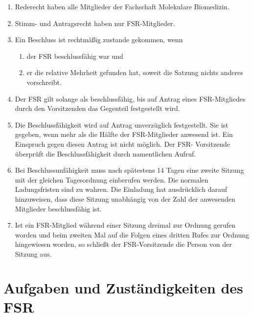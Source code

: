 \documentclass{article}
\providecommand{\tightlist}{\setlength{\itemsep}{0pt}\setlength{\parskip}{0pt}}
\begin{document}
\begin{enumerate}[(1)]
	\item Rederecht haben alle Mitglieder der Fachschaft Molekulare Biomedizin.
	\item Stimm- und Antragsrecht haben nur FSR-Mitglieder.
	\item Ein Beschluss ist rechtmäßig zustande gekommen, wenn
	\begin{enumerate}[1.]
		\tightlist
		\item der FSR beschlussfähig war und
		\item er die relative Mehrheit gefunden hat, soweit die Satzung nichts anderes vorschreibt.
	\end{enumerate}
	\item Der FSR gilt solange als beschlussfähig, bis auf Antrag eines FSR-Mitgliedes durch den Vorsitzenden das Gegenteil festgestellt wird.
	\item Die Beschlussfähigkeit wird auf Antrag unverzüglich festgestellt. Sie ist gegeben, wenn mehr als die Hälfte der FSR-Mitglieder anwesend ist. Ein Einspruch gegen diesen Antrag ist nicht möglich. Der FSR- Vorsitzende überprüft die Beschlussfähigkeit durch namentlichen Aufruf.
	\item Bei Beschlussunfähigkeit muss nach spätestens 14 Tagen eine zweite Sitzung mit der gleichen Tagesordnung einberufen werden. Die normalen Ladungsfristen sind zu wahren. Die Einladung hat ausdrücklich darauf hinzuweisen, dass diese Sitzung unabhängig von der Zahl der anwesenden Mitglieder beschlussfähig ist.
	\item Ist ein FSR-Mitglied während einer Sitzung dreimal zur Ordnung gerufen worden und beim zweiten Mal auf die Folgen eines dritten Rufes zur Ordnung hingewiesen worden, so schließt der FSR-Vorsitzende die Person von der Sitzung aus.
\end{enumerate}

\section{Aufgaben und Zuständigkeiten des FSR}\label{aufgaben-und-zustuxe4ndigkeiten-des-fsr}
\end{document}
